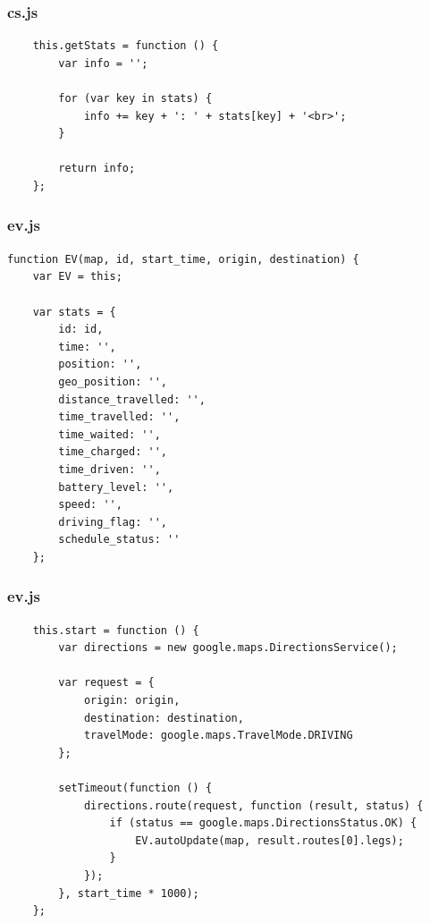 \begin{frame}[fragile]
\frametitle{cs.js}

\begin{verbatim}
    this.getStats = function () {
        var info = '';

        for (var key in stats) {
            info += key + ': ' + stats[key] + '<br>';
        }

        return info;
    };
\end{verbatim}

\end{frame}
\clearpage



\begin{frame}[fragile]
\frametitle{ev.js}

\begin{verbatim}
function EV(map, id, start_time, origin, destination) {
    var EV = this;

    var stats = {
        id: id,
        time: '',
        position: '',
        geo_position: '',
        distance_travelled: '',
        time_travelled: '',
        time_waited: '',
        time_charged: '',
        time_driven: '',
        battery_level: '',
        speed: '',
        driving_flag: '',
        schedule_status: ''
    };
\end{verbatim}

\end{frame}
\clearpage



\begin{frame}[fragile]
\frametitle{ev.js}

\begin{verbatim}
    this.start = function () {
        var directions = new google.maps.DirectionsService();

        var request = {
            origin: origin,
            destination: destination,
            travelMode: google.maps.TravelMode.DRIVING
        };

        setTimeout(function () {
            directions.route(request, function (result, status) {
                if (status == google.maps.DirectionsStatus.OK) {
                    EV.autoUpdate(map, result.routes[0].legs);
                }
            });
        }, start_time * 1000);
    };
\end{verbatim}

\end{frame}
\clearpage



